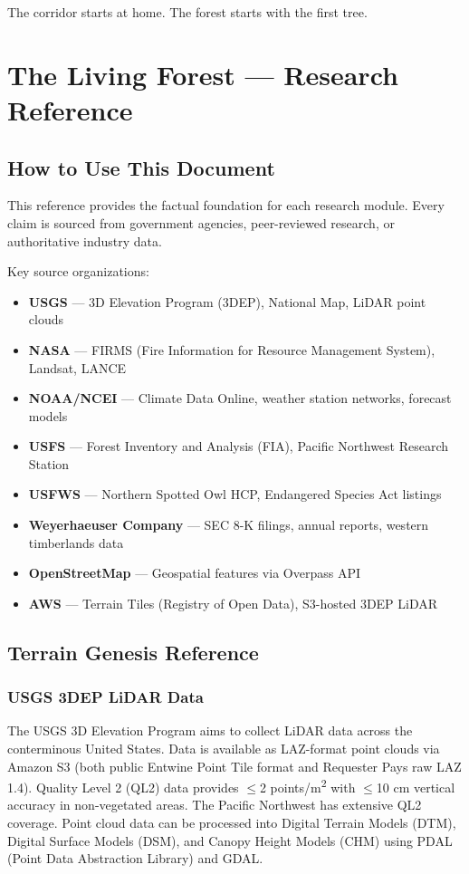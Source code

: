 \documentclass[11pt,letterpaper]{article}
\newcommand{\stageheader}[2]{%
  \noindent\colorbox{#2}{\makebox[\textwidth][l]{%
    \textcolor{white}{\bfseries\sffamily\hspace{6pt}#1\hspace{6pt}}}}%
  \vspace{0.5em}\par%
}
\begin{document}
The corridor starts at home. The forest starts with the first tree.


\newpage
\stageheader{STAGE 2 --- RESEARCH REFERENCE}{secondary}

\section{The Living Forest --- Research Reference}

\subsection{How to Use This Document}

This reference provides the factual foundation for each research module. Every claim is sourced from government agencies, peer-reviewed research, or authoritative industry data.

Key source organizations:
\begin{itemize}[nosep]
  \item \textbf{USGS} --- 3D Elevation Program (3DEP), National Map, LiDAR point clouds
  \item \textbf{NASA} --- FIRMS (Fire Information for Resource Management System), Landsat, LANCE
  \item \textbf{NOAA/NCEI} --- Climate Data Online, weather station networks, forecast models
  \item \textbf{USFS} --- Forest Inventory and Analysis (FIA), Pacific Northwest Research Station
  \item \textbf{USFWS} --- Northern Spotted Owl HCP, Endangered Species Act listings
  \item \textbf{Weyerhaeuser Company} --- SEC 8-K filings, annual reports, western timberlands data
  \item \textbf{OpenStreetMap} --- Geospatial features via Overpass API
  \item \textbf{AWS} --- Terrain Tiles (Registry of Open Data), S3-hosted 3DEP LiDAR
\end{itemize}

\subsection{Terrain Genesis Reference}

\subsubsection{USGS 3DEP LiDAR Data}
The USGS 3D Elevation Program aims to collect LiDAR data across the conterminous United States. Data is available as LAZ-format point clouds via Amazon S3 (both public Entwine Point Tile format and Requester Pays raw LAZ 1.4). Quality Level 2 (QL2) data provides $\leq$2 points/m\textsuperscript{2} with $\leq$10 cm vertical accuracy in non-vegetated areas. The Pacific Northwest has extensive QL2 coverage. Point cloud data can be processed into Digital Terrain Models (DTM), Digital Surface Models (DSM), and Canopy Height Models (CHM) using PDAL (Point Data Abstraction Library) and GDAL.
\end{document}

